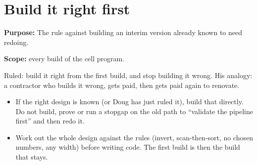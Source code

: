 \chapter{\texorpdfstring{Build it right first}{Build it right first}}
\label{chap:build-right-first}

\textbf{Purpose:} The rule against building an interim version already known to need redoing.

\textbf{Scope:} every build of the cell program.

Ruled: build it right from the first build, and stop building it wrong. His analogy: a contractor who builds it wrong, gets paid, then gets paid again to renovate.

\begin{itemize}
\item If the right design is known (or Doug has just ruled it), build that directly. Do not build, prove or run a stopgap on the old path to “validate the pipeline first” and then redo it.
\item Work out the whole design against the rules (invert, scan-then-sort, no chosen numbers, any width) before writing code. The first build is then the build that stays.
\end{itemize}
